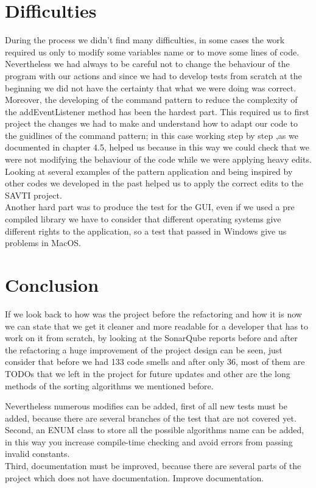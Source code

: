 \documentclass{article}
\begin{document}
\section{Difficulties}
During the process we didn't find many difficulties, in some cases the work required us only to modify some variables name or to move some lines of code. Nevertheless we had always to be careful not to change the behaviour of the program with our actions and since we had to develop tests from scratch at the beginning we did not have the certainty that what we were doing was correct.\\
Moreover, the developing of the command pattern to reduce the complexity of the addEventListener method has been the hardest part. This required us to first project the changes we had to make and understand how to adapt our code to the guidlines of the command pattern;
in this case working step by step ,as we documented in chapter 4.5, helped us because in this way we could check that we were not modifying the behaviour of the code while we were applying heavy edits. Looking at several examples of the pattern application and being inspired by other codes we developed in the past helped us to apply the correct edits to the SAVTI project.\\
Another hard part was to produce the test for the GUI, even if we used a pre compiled library we have to consider that different operating systems give different rights to the application, so a test that passed in Windows give us problems in MacOS.

\section{Conclusion}
If we look back to how was the project before the refactoring and how it is now we can state that we get it cleaner and more readable for a developer that has to work on it from scratch, by looking at the SonarQube reports before and after the refactoring a huge improvement of the project design can be seen, just consider that before we had 133 code smells and after only 36, most of them are TODOs that we left in the project for future updates and other are the long methods of the sorting algorithms we mentioned before.

Nevertheless numerous modifies can be added, first of all new tests must be added, because there are several branches of the test that are not covered yet.\\
Second, an ENUM class to store all the possible algorithms name can be added, in this way you increase compile-time checking and avoid errors from passing invalid constants.\\
Third, documentation must be improved, because there are several parts of the project which does not have documentation.
Improve documentation.
\end{document}
